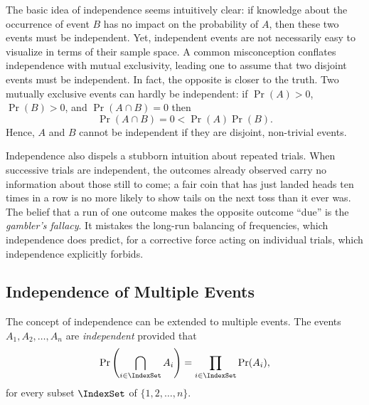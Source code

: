The basic idea of independence seems intuitively clear: if knowledge about the occurrence of event $B$ has no impact on the probability of $A$, then these two events must be independent.
Yet, independent events are not necessarily easy to visualize in terms of their sample space.
A common misconception conflates independence with mutual exclusivity, leading one to assume that two disjoint events must be independent.
In fact, the opposite is closer to the truth.
Two mutually exclusive events can hardly be independent: if $\Pr (A) > 0$, $\Pr (B) > 0$, and $\Pr (A \cap B) = 0$ then
\begin{equation*}
\Pr (A \cap B) = 0 < \Pr (A) \Pr(B).
\end{equation*}
Hence, $A$ and $B$ cannot be independent if they are disjoint, non-trivial events.

Independence also dispels a stubborn intuition about repeated trials.
When successive trials are independent, the outcomes already observed carry no information about those still to come;
a fair coin that has just landed heads ten times in a row is no more likely to show tails on the next toss than it ever was.
The belief that a run of one outcome makes the opposite outcome ``due'' is the \emph{gambler's fallacy}.
It mistakes the long-run balancing of frequencies, which independence does predict, for a corrective force acting on individual trials, which independence explicitly forbids.


\subsection{Independence of Multiple Events}

The concept of independence can be extended to multiple events.
The events $A_1, A_2, \ldots, A_n$ are \emph{independent} provided that 
\begin{equation} \label{equation:IndependenceMultipleEvents}
\Pr \left( \bigcap_{i \in \IndexSet} A_i \right)
= \prod_{i \in \IndexSet} \Pr (A_i) ,
\end{equation}
for every subset $\IndexSet$ of $\{1, 2, \ldots, n\}$.

